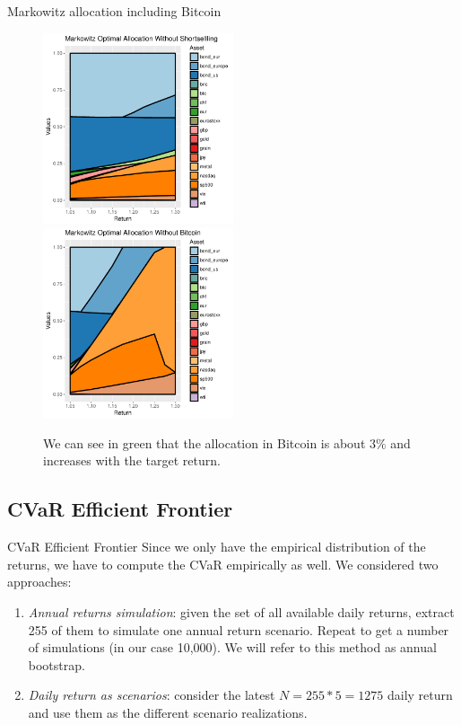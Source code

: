 \documentclass{beamer}
\begin{document}
\begin{frame}{Markowitz allocation including Bitcoin}
\begin{figure}
	\includegraphics[width=0.5\textwidth]{allocation_sample_btc_percentage}
	\includegraphics[width=0.5\textwidth]{allocation_sample_nobtc_percentage}
	\caption{We can see in green that the allocation in Bitcoin is about $3\%$ and increases with the target return.}
\end{figure}
\end{frame}

\subsection{CVaR Efficient Frontier}
\begin{frame}{CVaR Efficient Frontier}
Since we only have the empirical distribution of the returns, we have to compute the CVaR empirically as well. We considered two approaches: 

\begin{enumerate}
	\item \textit{Annual returns simulation}: given the set of all available daily returns, extract 255 of them to simulate one annual return scenario. Repeat to get a number of simulations (in our case 10,000).
	We will refer to this method as annual bootstrap.
	\item \textit{Daily return as scenarios}: consider the latest $N = 255 * 5 = 1275$  daily return and use them as the different scenario realizations.
\end{enumerate}
\end{frame}
\end{document}
